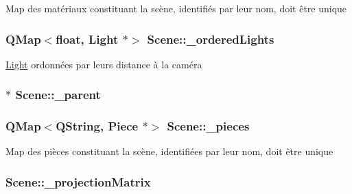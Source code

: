Map des matériaux constituant la scène, identifiés par leur nom, doit être unique \hypertarget{class_scene_a5fae715ba6bdde7c382f9d779095a718}{
\subsubsection[{\+\_\+ordered\+Lights}]{\setlength{\rightskip}{0pt plus 5cm}Q\+Map$<$float, {\bf Light} $\ast$$>$ Scene\+::\+\_\+ordered\+Lights\hspace{0.3cm}{\ttfamily [private]}}}\label{class_scene_a5fae715ba6bdde7c382f9d779095a718}
\hyperlink{class_light}{Light} ordonnées par leurs distance à la caméra \hypertarget{class_scene_ae394dcdd910d007d32a6aa3869d693e6}{
\subsubsection[{\+\_\+parent}]{$\ast$ Scene\+::\+\_\+parent\hspace{0.3cm}{\ttfamily [private]}}}\label{class_scene_ae394dcdd910d007d32a6aa3869d693e6}
\hypertarget{class_scene_aa3a488d4be41fe6a187488e1e7a1035c}{
\subsubsection[{\+\_\+pieces}]{\setlength{\rightskip}{0pt plus 5cm}Q\+Map$<$Q\+String, {\bf Piece} $\ast$$>$ Scene\+::\+\_\+pieces\hspace{0.3cm}{\ttfamily [private]}}}\label{class_scene_aa3a488d4be41fe6a187488e1e7a1035c}
Map des pièces constituant la scène, identifiées par leur nom, doit être unique \hypertarget{class_scene_a7db3394191c0a07e6bdc456a53ac8ece}{
\subsubsection[{\+\_\+projection\+Matrix}]{ Scene\+::\+\_\+projection\+Matrix\hspace{0.3cm}{\ttfamily [private]}}}\label{class_scene_a7db3394191c0a07e6bdc456a53ac8ece}
